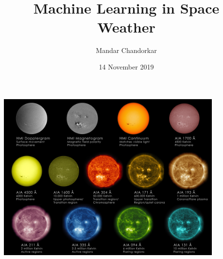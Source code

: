 \documentclass[a4paper]{article}            %
\title{Machine Learning in Space Weather}                  %
\author{Mandar Chandorkar}  %
\date{14 November 2019}  %
\begin{document}
\begin{titleslide}
\end{titleslide}


\begin{slidetop}
    
\end{slidetop}

\begin{slidetop}
    \begin{center}
        \includegraphics[width=0.85\textwidth]{sdo.jpg}%
    \end{center}
    
\end{slidetop}
\end{document}
